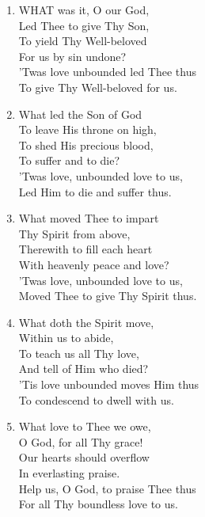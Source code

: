 \begin{enumerate}
    \item WHAT was it, O our God, \\
        Led Thee to give Thy Son, \\
        To yield Thy Well-beloved \\
        For us by sin undone? \\
        'Twas love unbounded led Thee thus \\
        To give Thy Well-beloved for us.

    \item What led the Son of God \\
        To leave His throne on high, \\
        To shed His precious blood, \\
        To suffer and to die? \\
        'Twas love, unbounded love to us, \\
        Led Him to die and suffer thus.

    \item What moved Thee to impart \\
        Thy Spirit from above, \\
        Therewith to fill each heart \\
        With heavenly peace and love? \\
        'Twas love, unbounded love to us, \\
        Moved Thee to give Thy Spirit thus.

    \item What doth the Spirit move, \\
        Within us to abide, \\
        To teach us all Thy love, \\
        And tell of Him who died? \\
        'Tis love unbounded moves Him thus \\
        To condescend to dwell with us.

    \item What love to Thee we owe, \\
        O God, for all Thy grace! \\
        Our hearts should overflow \\
        In everlasting praise. \\
        Help us, O God, to praise Thee thus \\
        For all Thy boundless love to us.

\end{enumerate}

